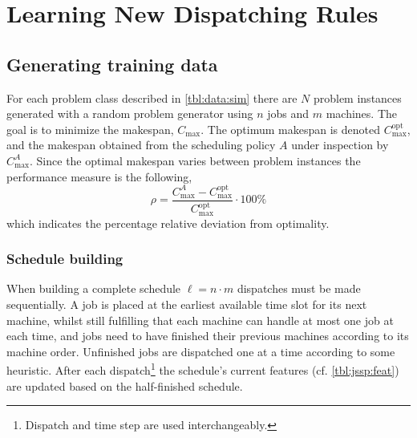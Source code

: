 \documentclass[smallextended]{svjour3}
\begin{document}
	
	
	
	
	\section{Learning New Dispatching Rules}\label{ch:learningmodels}
	
	
	
	\subsection{Generating training data}\label{sec:gentrainingdata}
	For each problem class described in \cref{tbl:data:sim} there are $N$ problem instances generated  with a random problem generator using $n$ jobs and $m$ machines. 
	The goal is to minimize the makespan, $C_{\max}$. The optimum makespan is denoted $C_{\max}^{\text{opt}}$, and the makespan obtained from the scheduling policy $A$ under inspection by $C_{\max}^{A}$. Since the optimal makespan varies between problem instances the performance measure is the following, 
	\begin{equation}\label{eq:ratio}\rho=\frac{C_{\max}^{A}-C_{\max}^{\text{opt}}}{C_{\max}^{\text{opt}}}\cdot 100\%\end{equation}
	which indicates the percentage relative deviation from optimality. %
	
	\subsubsection{Schedule building}\label{sec:gen:gametree}
	When building a complete schedule $\ell=n\cdot m$ dispatches must be made sequentially. 
	A job is placed at the earliest available time slot for its next machine, whilst still fulfilling that each machine can handle at most one job at each time, and jobs need to have finished their previous machines according to its machine order. 
	Unfinished jobs are dispatched one at a time according to some heuristic. After each dispatch\footnote{Dispatch and time step are used interchangeably.} the schedule's current features (cf. \cref{tbl:jssp:feat}) are updated based on the half-finished schedule. 
	
\end{document}
